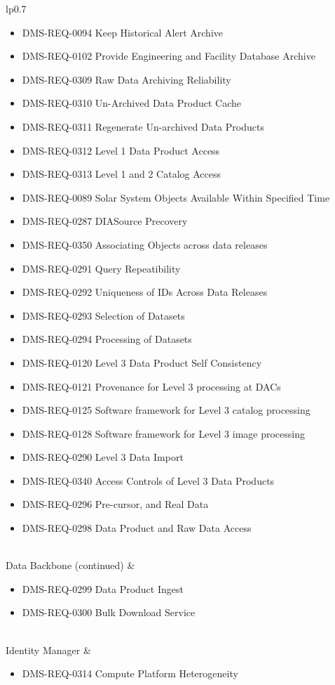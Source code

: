 \begin{xtabular}{lp{0.7\textwidth}}
\begin{itemize}
\item DMS-REQ-0094 Keep Historical Alert Archive
\item DMS-REQ-0102 Provide Engineering and Facility Database Archive
\item DMS-REQ-0309 Raw Data Archiving Reliability
\item DMS-REQ-0310 Un-Archived Data Product Cache
\item DMS-REQ-0311 Regenerate Un-archived Data Products
\item DMS-REQ-0312 Level 1 Data Product Access
\item DMS-REQ-0313 Level 1 and 2 Catalog Access
\item DMS-REQ-0089 Solar System Objects Available Within Specified Time
\item DMS-REQ-0287 DIASource Precovery
\item DMS-REQ-0350 Associating Objects across data releases
\item DMS-REQ-0291 Query Repeatibility
\item DMS-REQ-0292 Uniqueness of IDs Across Data Releases
\item DMS-REQ-0293 Selection of Datasets
\item DMS-REQ-0294 Processing of Datasets
\item DMS-REQ-0120 Level 3 Data Product Self Consistency
\item DMS-REQ-0121 Provenance for Level 3 processing at DACs
\item DMS-REQ-0125 Software framework for Level 3 catalog processing
\item DMS-REQ-0128 Software framework for Level 3 image processing
\item DMS-REQ-0290 Level 3 Data Import
\item DMS-REQ-0340 Access Controls of Level 3 Data Products
\item DMS-REQ-0296 Pre-cursor, and Real Data
\item DMS-REQ-0298 Data Product and Raw Data Access
\end{itemize} \\ \hline
Data Backbone (continued) &
\begin{itemize}
\item DMS-REQ-0299 Data Product Ingest
\item DMS-REQ-0300 Bulk Download Service
\end{itemize} \\ \hline
Identity Manager &
\begin{itemize}
\item DMS-REQ-0314 Compute Platform Heterogeneity

\end{itemize}
\end{xtabular}
